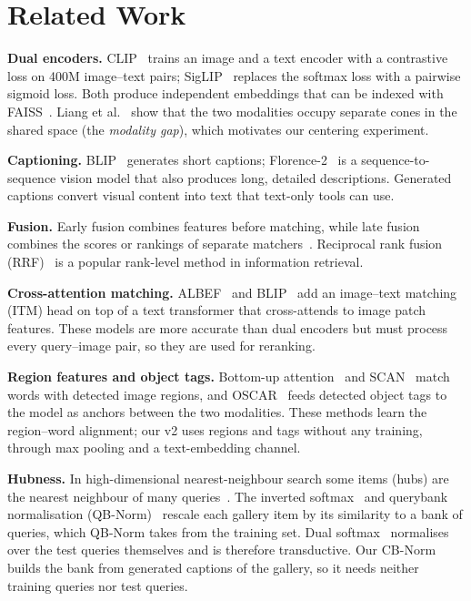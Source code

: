 \documentclass[conference]{IEEEtran}
\begin{document}
\section{Related Work}
\textbf{Dual encoders.} CLIP~\cite{radford2021clip} trains an image and a text encoder with a contrastive
loss on 400M image--text pairs; SigLIP~\cite{zhai2023siglip} replaces the softmax loss with a pairwise
sigmoid loss. Both produce independent embeddings that can be indexed with FAISS~\cite{johnson2019faiss}.
Liang et al.~\cite{liang2022gap} show that the two modalities occupy separate cones in the shared space
(the \emph{modality gap}), which motivates our centering experiment.

\textbf{Captioning.} BLIP~\cite{li2022blip} generates short captions; Florence-2~\cite{xiao2024florence}
is a sequence-to-sequence vision model that also produces long, detailed descriptions. Generated captions
convert visual content into text that text-only tools can use.

\textbf{Fusion.} Early fusion combines features before matching, while late fusion combines the scores
or rankings of separate matchers~\cite{snoek2005fusion}. Reciprocal rank fusion (RRF)~\cite{cormack2009rrf}
is a popular rank-level method in information retrieval.

\textbf{Cross-attention matching.} ALBEF~\cite{li2021albef} and BLIP~\cite{li2022blip} add an
image--text matching (ITM) head on top of a text transformer that cross-attends to image patch features.
These models are more accurate than dual encoders but must process every query--image pair, so they are used
for reranking.

\textbf{Region features and object tags.} Bottom-up attention~\cite{anderson2018bottomup} and
SCAN~\cite{lee2018scan} match words with detected image regions, and OSCAR~\cite{li2020oscar} feeds detected object
tags to the model as anchors between the two modalities. These methods learn the region--word alignment; our v2 uses
regions and tags without any training, through max pooling and a text-embedding channel.

\textbf{Hubness.} In high-dimensional nearest-neighbour search some items (hubs) are the nearest neighbour of
many queries~\cite{radovanovic2010hubs}. The inverted softmax~\cite{smith2017invsoftmax} and querybank
normalisation (QB-Norm)~\cite{bogolin2022qbnorm} rescale each gallery item by its similarity to a bank of
queries, which QB-Norm takes from the training set. Dual softmax~\cite{cheng2021camoe} normalises over the test
queries themselves and is therefore transductive. Our CB-Norm builds the bank from generated captions of the
gallery, so it needs neither training queries nor test queries.
\end{document}
